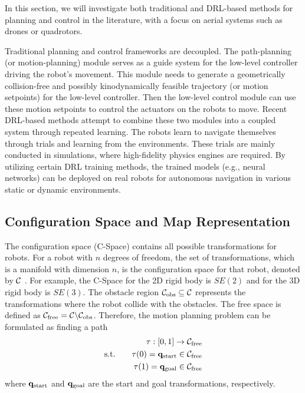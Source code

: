 \documentclass[letterpaper,journal,twoside]{IEEEtran}
\begin{document}
In this section, we will investigate both traditional 
and DRL-based methods for planning and control in the 
literature, with a focus on aerial systems 
such as drones or quadrotors.

Traditional planning and control frameworks are decoupled.
The path-planning (or motion-planning) module serves as a guide system 
for the low-level controller driving the robot's movement. 
This module needs to generate a geometrically 
collision-free and possibly kinodynamically feasible trajectory 
(or motion setpoints) for the low-level controller.
Then the low-level control module can use these motion 
setpoints to control the actuators on the robots to move.
Recent DRL-based methods attempt to combine these two modules 
into a coupled system through repeated learning. 
The robots learn to navigate themselves through trials and learning 
from the environments.
These trials are mainly conducted in simulations, 
where high-fidelity physics engines are required. 
By utilizing certain DRL training methods, 
the trained models (e.g., neural networks) can be deployed 
on real robots for autonomous navigation in various static 
or dynamic environments.

\subsection{Configuration Space and Map Representation}
The configuration space (C-Space) contains all possible transformations
for robots. 
For a robot with $n$ degrees of freedom, the set of 
transformations, which is a manifold with dimension $n$, is 
the configuration space for that robot, denoted by $\mathcal{C}$
\cite{quan2020survey}. 
For example, the C-Space for the 2D rigid body is $SE(2)$ 
and for the 3D rigid body is $SE(3)$.
The obstacle region $\mathcal{C}_{\text{obs}} \subseteq \mathcal{C}$ 
represents the transformations where the robot collide with the obstacles. 
The free space is defined as $\mathcal{C}_{\text{free}} = 
\mathcal{C} \backslash \mathcal{C}_{\text{obs}}$.
Therefore, the motion planning problem can be formulated as 
finding a path 
\[
\begin{aligned}
  &&\tau : \left[0,1\right]\rightarrow \mathcal{C}_{\text{free}} \\
  &\text{s.t.}\quad&\tau(0) = \mathbf{q}_{\text{start}} \in \mathcal{C}_{\text{free}} \\
  &&\tau(1) = \mathbf{q}_{\text{goal}} \in \mathcal{C}_{\text{free}}
\end{aligned}
\]
where $\mathbf{q}_{\text{start}}$ and $\mathbf{q}_{\text{goal}}$ are the start and goal transformations, respectively.
\end{document}
